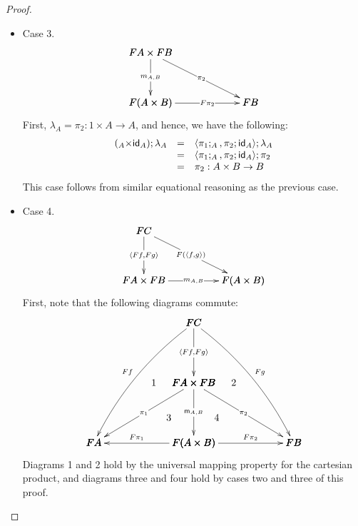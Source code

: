 \documentclass{article}
\let\mto\to
\let\to\rightarrow
\newcommand{\id}[0]{\mathsf{id}}
\let\t\relax
\newcommand{\t}[0]{\mathsf{t}}
\newcommand{\m}[1]{\mathsf{m}_{#1}}
\begin{document}
\begin{proof}
\begin{itemize}
  \item[] Case 3.\\    
    \[
      \bfig    
      \btriangle|mmm|<1000,500>[
        FA \times FB`
        F(A \times B)`
        FB;
        m_{A,B}`
        \pi_2`
        F\pi_2]
      \efig
    \]
    First, $\lambda_A = \pi_2 : 1 \times A \mto A$, and hence, we have the following:
      \[
      \begin{array}{lll}
        (\t_A \times \id_A);\lambda_A & = & \langle \pi_1;\t_A, \pi_2;\id_A \rangle;\lambda_A\\
        & = & \langle \pi_1;\t_A, \pi_2;\id_A \rangle;\pi_2\\
        & = & \pi_2 : A \times B \mto B
      \end{array}
      \]
      This case follows from similar equational reasoning
      as the previous case.      
      
  \item[] Case 4.\\    
    \[
    \bfig
    \btriangle|mmm|<1000,500>[
      FC`
      FA \times FB`
      F(A \times B);
      \langle Ff, Fg \rangle`
      F(\langle f, g \rangle)`
      m_{A,B}]
    \efig
    \]
    First, note that the following diagrams commute:
    \[
    \bfig
    \Atrianglepair|mmmaa|/->`->`->`<-`->/<1000,600>[
      FA \times FB`
      FA`
      F(A \times B)`
      FB;
      \pi_1`
      \m{A,B}`
      \pi_2`
      F\pi_1`
      F\pi_2]
    \morphism(1000,1200)|m|<0,-600>[FC`FA \times FB;\langle Ff, Fg \rangle]
    \morphism(1000,1200)/{@{>}@/^-1em/}/<-1000,-1200>[FC`FA;Ff]
    \morphism(1000,1200)/{@{>}@/^1em/}/<1000,-1200>[FC`FB;Fg]
    \place(600,600)[1]
    \place(1400,600)[2]
    \place(750,250)[3]
    \place(1230,250)[4]
    \efig
    \]
    Diagrams 1 and 2 hold by the universal mapping property for the
    cartesian product, and diagrams three and four hold by cases two
    and three of this proof.


\end{itemize}
\end{proof}
\end{document}
